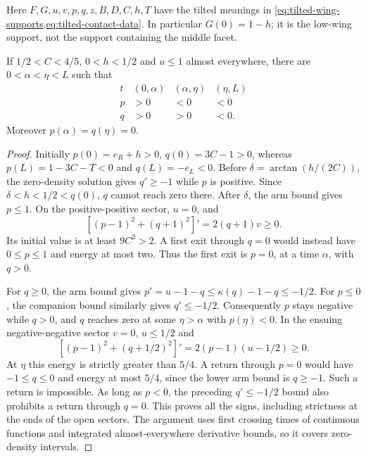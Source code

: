 Here $F,G,u,v,p,q,z,B,D,C,h,T$ have the tilted meanings in
\cref{eq:tilted-wing-supports,eq:tilted-contact-data}. In
particular $G(0)=1-h$; it is the low-wing support, not the
support containing the middle facet.

\begin{lemma}\label{lem:tilted-contact-signs}
If $1/2<C<4/5$, $0<h<1/2$ and $u\le1$ almost everywhere,
there are $0<\alpha<\eta<L$ such that
\[
 \begin{array}{c|ccc}
 t&(0,\alpha)&(\alpha,\eta)&(\eta,L)\\ \hline
 p&>0&<0&<0\\
 q&>0&>0&<0.
 \end{array}
\]
Moreover $p(\alpha)=q(\eta)=0$.
\end{lemma}
\begin{proof}
Initially $p(0)=e_R+h>0$, $q(0)=3C-1>0$, whereas
$p(L)=1-3C-T<0$ and $q(L)=-e_L<0$.
Before $\delta=\arctan(h/(2C))$, the zero-density solution
gives $q'\ge-1$ while $p$ is positive. Since
$\delta<h<1/2<q(0)$, $q$ cannot reach zero there.
After $\delta$, the arm bound gives $p\le1$.
On the positive-positive sector, $u=0$, and
\[
 [(p-1)^2+(q+1)^2]'=2(q+1)v\ge0.
\]
Its initial value is at least $9C^2>2$. A first exit through
$q=0$ would instead have $0\le p\le1$ and energy at most two.
Thus the first exit is $p=0$, at a time $\alpha$, with $q>0$.

For $q\ge0$, the arm bound gives
$p'=u-1-q\le\kappa(q)-1-q\le-1/2$.
For $p\le0$, the companion bound similarly gives $q'\le-1/2$.
Consequently $p$ stays negative while $q>0$, and $q$ reaches
zero at some $\eta>\alpha$ with $p(\eta)<0$.
In the ensuing negative-negative sector $v=0$, $u\le1/2$ and
\[
 [(p-1)^2+(q+1/2)^2]'=2(p-1)(u-1/2)\ge0.
\]
At $\eta$ this energy is strictly greater than $5/4$.
A return through $p=0$ would have $-1\le q\le0$ and energy
at most $5/4$, since the lower arm bound is $q\ge-1$.
Such a return is impossible. As long as $p<0$, the preceding
$q'\le-1/2$ bound also prohibits a return through $q=0$.
This proves all the signs, including strictness at the ends of
the open sectors. The argument uses first crossing times of
continuous functions and integrated almost-everywhere derivative
bounds, so it covers zero-density intervals.
\end{proof}

